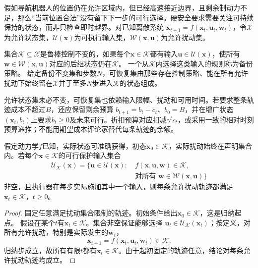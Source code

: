 假如导航机器人的位置仍在允许区域内，但已经高速接近边界，且剩余制动力不足，那么“当前位置合法”没有留下下一步的可行选择。硬安全要求需要关注可持续保持的状态，而非只检查即时越界。对已知离散系统
$\bm{x}_{t+1}=f(\bm{x}_t,\bm{u}_t,\bm{w}_t)$，令$\mathcal X$为允许状态集，$\mathcal U(\bm{x})$为可执行输入集，$\mathcal W(\bm{x},\bm{u})$为允许扰动集。

\begin{definition}[控制不变集与可恢复集]
  \label{def:rl-trustworthy-invariance}
  集合$\mathcal K\subseteq\mathcal X$是鲁棒控制不变的，如果每个$\bm{x}\in\mathcal K$都有输入$\bm{u}\in\mathcal U(\bm{x})$，使所有
  $\bm{w}\in\mathcal W(\bm{x},\bm{u})$对应的后继状态仍在$\mathcal K$。
  一个从$\mathcal K$内选择这类输入的规则称为备份策略。
  给定备份不变集和步数$N$，可恢复集由那些存在控制策略、能在所有允许扰动下始终留在$\mathcal X$并于至多$N$步进入$\mathcal K$的状态组成。
\end{definition}

允许状态集未必不变，可恢复集也依赖输入限幅、扰动和可用时间。若要求整条轨迹成本不超过$B$，还应保留剩余预算
$b_{t+1}=b_t-c_t$、$b_0=B$，并在增广状态$(\bm{x}_t,b_t)$上要求$b_t\geq0$及未来可行。折扣预算对应扣减$\gamma^tc_t$，或采用一致的相对时刻预算递推；不能用期望成本评论家替代每条轨迹的余额。

\begin{theorem}[安全集的一步封闭性保证]
  \label{thm:rl-trustworthy-invariance}
  假定动力学$f$已知，实际状态可准确获得，初态$\bm{x}_0\in\mathcal K$，实际扰动始终在声明集合内。若每个$\bm{x}\in\mathcal K$的可行保护输入集合
  \[
    \begin{aligned}
      \mathcal U_{\mathcal K}(\bm{x})
        =\bigl\{\bm{u}\in\mathcal U(\bm{x}):\ &
          f(\bm{x},\bm{u},\bm{w})\in\mathcal K,\\
        &\text{对所有 }\bm{w}\in\mathcal W(\bm{x},\bm{u})\bigr\}
    \end{aligned}
  \]
  非空，且执行器在每步实际施加其中一个输入，则每条允许扰动轨迹都满足$\bm{x}_t\in\mathcal K$，$t\geq0$。
\end{theorem}
\begin{proof}
  固定任意满足扰动集合限制的轨迹。初始条件给出$\bm{x}_0\in\mathcal K$，这是归纳起点。
  假设在某个$t$有$\bm{x}_t\in\mathcal K$。集合非空保证能够选择
  $\bm{u}_t\in\mathcal U_{\mathcal K}(\bm{x}_t)$；按定义，对所有允许扰动，特别是实际发生的$\bm{w}_t$，
  \[
    \bm{x}_{t+1}=f(\bm{x}_t,\bm{u}_t,\bm{w}_t)\in\mathcal K.
  \]
  归纳步成立，故所有有限$t$都有$\bm{x}_t\in\mathcal K$。由于起初固定的轨迹任意，结论对每条允许扰动轨迹均成立。
\end{proof}

